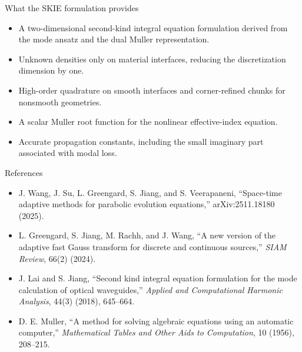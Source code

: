 \documentclass[aspectratio=169,10pt]{beamer}
\begin{document}
\begin{frame}{What the SKIE formulation provides}
\small
\begin{itemize}
  \item A two-dimensional second-kind integral equation formulation derived
  from the mode ansatz and the dual Muller representation.
  \item Unknown densities only on material interfaces, reducing the
  discretization dimension by one.
  \item High-order quadrature on smooth interfaces and corner-refined chunks
  for nonsmooth geometries.
  \item A scalar Muller root function for the nonlinear effective-index
  equation.
  \item Accurate propagation constants, including the small imaginary part
  associated with modal loss.
\end{itemize}
\end{frame}

\begin{frame}{References}
\scriptsize
\begin{itemize}
  \item J. Wang, J. Su, L. Greengard, S. Jiang, and S. Veerapaneni,
  ``Space-time adaptive methods for parabolic evolution equations,''
  arXiv:2511.18180 (2025).
  \item L. Greengard, S. Jiang, M. Rachh, and J. Wang, ``A new version of the
  adaptive fast Gauss transform for discrete and continuous sources,''
  \emph{SIAM Review}, 66(2) (2024).
  \item J. Lai and S. Jiang, ``Second kind integral equation formulation for the
  mode calculation of optical waveguides,'' \emph{Applied and Computational
  Harmonic Analysis}, 44(3) (2018), 645--664.
  \item D. E. Muller, ``A method for solving algebraic equations using an
  automatic computer,'' \emph{Mathematical Tables and Other Aids to
  Computation}, 10 (1956), 208--215.
\end{itemize}
\end{frame}
\end{document}
